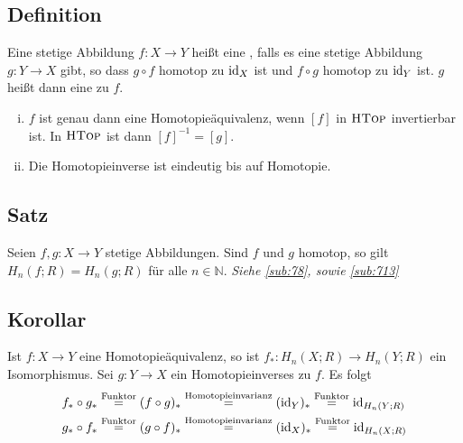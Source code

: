 \subsection[Definition: Homotopieäquivalenz und Homotopieinverse]{Definition} %
\label{sub:72}
Eine stetige Abbildung $f \colon X \to Y$ heißt eine , falls es eine stetige Abbildung $g \colon Y \to X$ gibt, so dass $g \circ f$ homotop zu 
$\operatorname{id}_X$ ist und $f \circ g$ homotop zu $\operatorname{id}_Y$ ist. $g$ heißt dann eine  zu $f$.
\begin{enumerate}[(i)]
	\item $f$ ist genau dann eine Homotopieäquivalenz, wenn $[f]$ in $\textsc{HTop}$ invertierbar ist. In $\textsc{HTop}$ ist dann $[f]^{-1} = [g]$.
	\item Die Homotopieinverse ist eindeutig bis auf Homotopie.
\end{enumerate}

\subsection[Satz: Homotopieinvarianz der Homologie]{Satz} %
\label{sub:73}
Seien $f,g \colon X \to Y$ stetige Abbildungen. Sind $f$ und $g$ homotop, so gilt $H_n(f;R) = H_n(g;R)$ für alle $n \in \mathds{N}$.
\emph{Siehe \ref{sub:78}, sowie \ref{sub:713} } \bewende


\subsection[Korollar: Die induzierte Abbildung einer Homotopieäquivalenz ist ein Isomorphismus]{Korollar} %
\label{sub:74}
Ist $f \colon X \to Y$ eine Homotopieäquivalenz, so ist $f_* \colon H_n(X;R) \to H_n(Y;R)$ ein Isomorphismus.
Sei $g \colon Y \to X$ ein Homotopieinverses zu $f$. Es folgt 
\begin{align*}
	f_* \circ g_* &\stackrel{\text{Funktor}}{=} (f \circ g)_* \stackrel{\text{Homotopieinvarianz}}{=} (\operatorname{id}_Y)_* \stackrel{\text{Funktor}}{=} \operatorname{id}_{H_n(Y;R)} \\
	g_* \circ f_* &\stackrel{\text{Funktor}}{=} (g \circ f)_* \stackrel{\text{Homotopieinvarianz}}{=} (\operatorname{id}_X)_* \stackrel{\text{Funktor}}{=} \operatorname{id}_{H_n(X;R)}
\end{align*}

